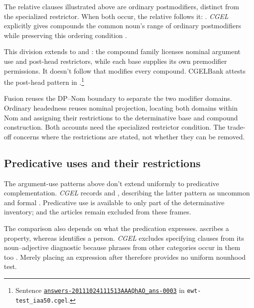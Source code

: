 \documentclass[12pt]{article}
\begin{document}
The relative clauses illustrated above are ordinary postmodifiers, distinct from the specialized restrictor. When both occur, the relative follows it: . \textit{CGEL} explicitly gives compounds the common noun's range of ordinary postmodifiers while preserving this ordering condition \citep[423]{huddleston2002}.

This division extends to  and : the compound family licenses nominal argument use and post-head restrictors, while each base supplies its own premodifier permissions. It doesn't follow that  modifies every compound. CGELBank attests the post-head pattern in .\footnote{Sentence \href{https://github.com/nert-nlp/cgel/blob/d0a2c2d8c522b23d5aa879fc9cb94948f4285b2c/datasets/ewt-test_iaa50.cgel\#L179-L181}{\nolinkurl{answers-20111024111513AAAQhAO_ans-0003}} in \nolinkurl{ewt-test_iaa50.cgel}.}

Fusion reuses the DP--Nom boundary to separate the two modifier domains. Ordinary headedness reuses nominal projection, locating both domains within Nom and assigning their restrictions to the determinative base and compound construction. Both accounts need the specialized restrictor condition. The trade-off concerns where the restrictions are stated, not whether they can be removed.

\subsection{Predicative uses and their restrictions}\label{sec:predication}

The argument-use patterns above don't extend uniformly to predicative complementation. \textit{CGEL} records  and , describing the latter pattern as uncommon and formal \citep[392, 395--396]{huddleston2002}. Predicative use is available to only part of the determinative inventory;  and the articles remain excluded from these frames.

The comparison also depends on what the predication expresses.  ascribes a property, whereas  identifies a person. \textit{CGEL} excludes specifying  clauses from its noun--adjective diagnostic because phrases from other categories occur in them too \citep[536]{huddleston2002}. Merely placing an expression after  therefore provides no uniform nounhood test.
\end{document}
